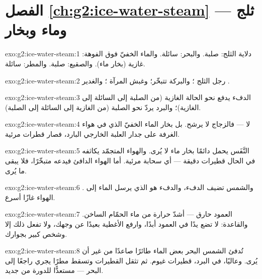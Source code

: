 \section*{الفصل \ref{ch:g2:ice-water-steam} --- ثلج وماء وبخار}

\begin{solution}{exo:g2:ice-water-steam:1}
دلاية الثلج: صلبة. والبحر: سائلة. والماء الخفيّ فوق الفوهة:
غازية (بخار ماء). والصقيع: صلبة. والمطر: سائلة.
\end{solution}

\begin{solution}{exo:g2:ice-water-steam:2}
رجل الثلج ؛ والبركة تتبخّر؛ وغبش المرآة ؛
والغدير .
\end{solution}

\begin{solution}{exo:g2:ice-water-steam:3}
الدفء يدفع نحو الحالة الغازية (من الصلبة إلى السائلة إلى
الغازية)؛ والبرد يردّ نحو الصلبة (من الغازية إلى السائلة إلى
الصلبة).
\end{solution}

\begin{solution}{exo:g2:ice-water-steam:4}
لا --- فالزجاج لا يرشح. بل  بخار الماء الخفيّ الذي في هواء
الغرفة على جدار العلبة الخارجي البارد، فصار قطرات مرئية.
\end{solution}

\begin{solution}{exo:g2:ice-water-steam:5}
النَّفَس يحمل دائمًا بخار ماء لا يُرى. والهواء المتجمّد يكاثفه
في الحال قطيرات دقيقة --- أي سحابة مرئية. أما الهواء الدافئ
فيدعه متبخّرًا، فلا يبقى ما يُرى.
\end{solution}

\begin{solution}{exo:g2:ice-water-steam:6}
. والشمس تضيف الدفء، والدفء هو الذي يرسل الماء إلى
الهواء غازًا أسرع.
\end{solution}

\begin{solution}{exo:g2:ice-water-steam:7}
العمود حارق --- أشدّ حرارة من ماء الحمّام الساخن. والقاعدة: لا
تضع يدًا في العمود أبدًا، وارفع الأغطية بعيدًا عن وجهك، ولا
تفعل ذلك إلا وشخص كبير بجوارك.
\end{solution}

\begin{solution}{exo:g2:ice-water-steam:8}
تُدفئ الشمس البحر  بعض الماء طائرًا صاعدًا من غير أن
يُرى. وعاليًا، في البرد،  قطيرات غيوم. ثم تثقل القطيرات
وتسقط مطرًا يجري راجعًا إلى البحر --- مستعدًّا للدورة من جديد.
\end{solution}


